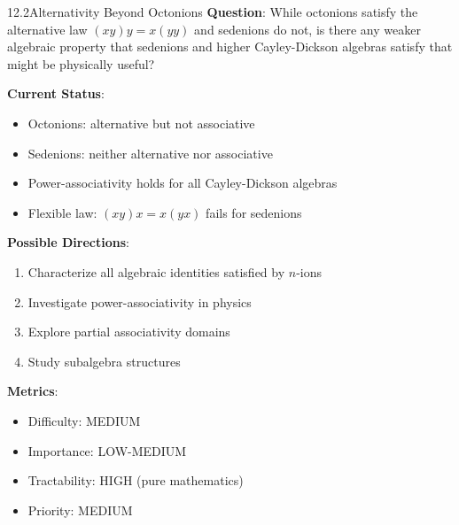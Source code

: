 \begin{openproblem}{12.2}{Alternativity Beyond Octonions}
\textbf{Question}: While octonions satisfy the alternative law $(xy)y = x(yy)$ and sedenions do not, is there any weaker algebraic property that sedenions and higher Cayley-Dickson algebras satisfy that might be physically useful?

\textbf{Current Status}:
\begin{itemize}
    \item Octonions: alternative but not associative
    \item Sedenions: neither alternative nor associative
    \item Power-associativity holds for all Cayley-Dickson algebras
    \item Flexible law: $(xy)x = x(yx)$ fails for sedenions
\end{itemize}

\textbf{Possible Directions}:
\begin{enumerate}
    \item Characterize all algebraic identities satisfied by $n$-ions
    \item Investigate power-associativity in physics
    \item Explore partial associativity domains
    \item Study subalgebra structures
\end{enumerate}

\textbf{Metrics}:
\begin{itemize}
    \item Difficulty: MEDIUM
    \item Importance: LOW-MEDIUM
    \item Tractability: HIGH (pure mathematics)
    \item Priority: MEDIUM
\end{itemize}
\end{openproblem}

